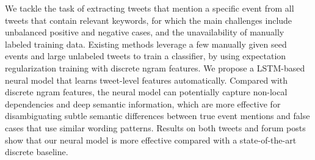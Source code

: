 We tackle the task of extracting tweets that mention a specific event from all tweets that contain relevant keywords, for which the main challenges include unbalanced positive and negative cases, and the unavailability of manually labeled training data. Existing methods leverage a few manually given seed events and large unlabeled tweets to train a classifier, by using expectation regularization training with discrete ngram features. We propose a LSTM-based neural model that learns tweet-level features automatically. Compared with discrete ngram features, the neural model can potentially capture non-local dependencies and deep semantic information, which are more effective for disambiguating subtle semantic differences between true event mentions and false cases that use similar wording patterns. Results on both tweets and forum posts show that our neural model is more effective compared with a state-of-the-art discrete baseline.
